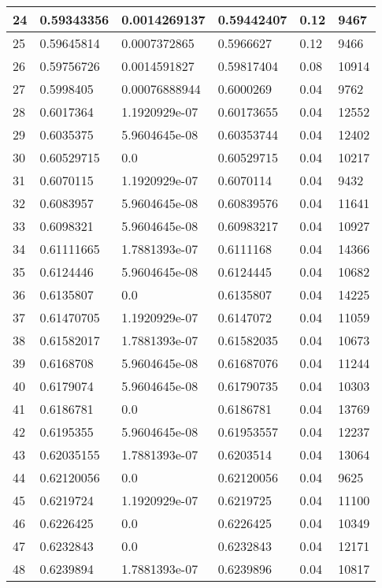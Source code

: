 \begin{longtable}{|l|l|l|l|l|l|}
24 & 0.59343356 & 0.0014269137 & 0.59442407 & 0.12 & 9467 \\ \hline 
25 & 0.59645814 & 0.0007372865 & 0.5966627 & 0.12 & 9466 \\ \hline 
26 & 0.59756726 & 0.0014591827 & 0.59817404 & 0.08 & 10914 \\ \hline 
27 & 0.5998405 & 0.00076888944 & 0.6000269 & 0.04 & 9762 \\ \hline 
28 & 0.6017364 & 1.1920929e-07 & 0.60173655 & 0.04 & 12552 \\ \hline 
29 & 0.6035375 & 5.9604645e-08 & 0.60353744 & 0.04 & 12402 \\ \hline 
30 & 0.60529715 & 0.0 & 0.60529715 & 0.04 & 10217 \\ \hline 
31 & 0.6070115 & 1.1920929e-07 & 0.6070114 & 0.04 & 9432 \\ \hline 
32 & 0.6083957 & 5.9604645e-08 & 0.60839576 & 0.04 & 11641 \\ \hline 
33 & 0.6098321 & 5.9604645e-08 & 0.60983217 & 0.04 & 10927 \\ \hline 
34 & 0.61111665 & 1.7881393e-07 & 0.6111168 & 0.04 & 14366 \\ \hline 
35 & 0.6124446 & 5.9604645e-08 & 0.6124445 & 0.04 & 10682 \\ \hline 
36 & 0.6135807 & 0.0 & 0.6135807 & 0.04 & 14225 \\ \hline 
37 & 0.61470705 & 1.1920929e-07 & 0.6147072 & 0.04 & 11059 \\ \hline 
38 & 0.61582017 & 1.7881393e-07 & 0.61582035 & 0.04 & 10673 \\ \hline 
39 & 0.6168708 & 5.9604645e-08 & 0.61687076 & 0.04 & 11244 \\ \hline 
40 & 0.6179074 & 5.9604645e-08 & 0.61790735 & 0.04 & 10303 \\ \hline 
41 & 0.6186781 & 0.0 & 0.6186781 & 0.04 & 13769 \\ \hline 
42 & 0.6195355 & 5.9604645e-08 & 0.61953557 & 0.04 & 12237 \\ \hline 
43 & 0.62035155 & 1.7881393e-07 & 0.6203514 & 0.04 & 13064 \\ \hline 
44 & 0.62120056 & 0.0 & 0.62120056 & 0.04 & 9625 \\ \hline 
45 & 0.6219724 & 1.1920929e-07 & 0.6219725 & 0.04 & 11100 \\ \hline 
46 & 0.6226425 & 0.0 & 0.6226425 & 0.04 & 10349 \\ \hline 
47 & 0.6232843 & 0.0 & 0.6232843 & 0.04 & 12171 \\ \hline 
48 & 0.6239894 & 1.7881393e-07 & 0.6239896 & 0.04 & 10817 \\ \hline 

\end{longtable}
